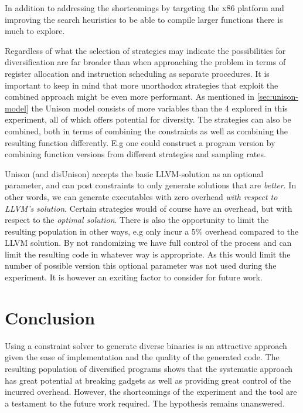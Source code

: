 In addition to addressing the shortcomings by targeting the x86 platform and improving
the search heuristics to be able to compile larger functions there is much to explore.

Regardless of what the selection of strategies may indicate the possibilities for
diversification are far broader than when approaching the problem in terms of register
allocation and instruction scheduling as separate procedures.  It is important to keep in
mind that more unorthodox strategies that exploit the combined approach might be even more
performant. As mentioned in \ref{sec:unison-model} the Unison model consists of more
variables than the 4 explored in this experiment, all of which offers potential for
diversity. The strategies can also be combined, both in terms of combining the constraints
as well as combining the resulting function differently. E.g one could construct a program
version by combining function versions from different strategies and sampling rates.

Unison (and disUnison) accepts the basic LLVM-solution as an optional parameter, and can
post constraints to only generate solutions that are \textit{better}. In other words, we
can generate executables with zero overhead \textit{with respect to LLVM's solution}.
Certain strategies would of course have an overhead, but with respect to the
\textit{optimal solution}. There is also the opportunity to limit the resulting population
in other ways, e.g only incur a 5\% overhead compared to the LLVM solution. By not
randomizing we have full control of the process and can limit the resulting code in
whatever way is appropriate. As this would limit the number of possible version this
optional parameter was not used during the experiment. It is however an exciting factor
to consider for future work.

\section{Conclusion}

Using a constraint solver to generate diverse binaries is an attractive approach given
the ease of implementation and the quality of the generated code. The resulting population
of diversified programs shows that the systematic approach has great potential at breaking
gadgets as well as providing great control of the incurred overhead. However, the
shortcomings of the experiment and the tool are a testament to the future work required.
The hypothesis remains unanswered.

